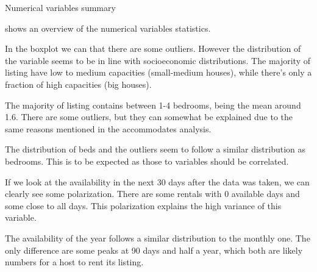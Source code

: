 
\begin{table}[H]
    \centering
    \caption{Numerical variables summary}%
    \label{tab:num_summary}
    \resizebox{\linewidth}{!}{%
    
}
\end{table}

 shows an overview of the numerical variables statistics.




In the boxplot we can that there are some outliers. However the distribution of
the variable seems to be in line with socioeconomic distributions. The majority
of listing have low to medium capacities (small-medium houses), while there's
only a fraction of high capacities (big houses).



The majority of listing contains between 1-4 bedrooms, being the mean around
1.6. There are some outliers, but they can somewhat be explained due to the same
reasons mentioned in the accommodates analysis.



The distribution of beds and the outliers seem to follow a similar distribution
as bedrooms.  This is to be expected as those to variables should be correlated.



If we look at the availability in the next 30 days after the data was taken, we
can clearly see some polarization. There are some rentals with 0 available days
and some close to all days. This polarization explains the high variance of this
variable.



The availability of the year follows a similar distribution to the monthly one.
The only difference are some peaks at 90 days and half a year, which both are
likely numbers for a host to rent its listing.


